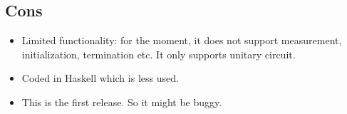 \documentclass{article}
\begin{document}
\subsection{Cons}
\begin{itemize}
\item[1.] Limited functionality: for the moment, it does not support
  measurement, initialization, termination etc. It only supports
  unitary circuit.
\item[2.] Coded in Haskell which is less used.
\item[3.] This is the first release. So it might be buggy.
\end{itemize}
\end{document}
